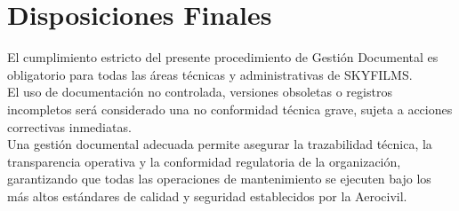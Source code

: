 \section{Disposiciones Finales}
El cumplimiento estricto del presente procedimiento de Gestión Documental es obligatorio para todas las áreas técnicas y administrativas de SKYFILMS.\\

El uso de documentación no controlada, versiones obsoletas o registros incompletos será considerado una no conformidad técnica grave, sujeta a acciones correctivas inmediatas.\\

Una gestión documental adecuada permite asegurar la trazabilidad técnica, la transparencia operativa y la conformidad regulatoria de la organización, garantizando que todas las operaciones de mantenimiento se ejecuten bajo los más altos estándares de calidad y seguridad establecidos por la Aerocivil.